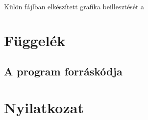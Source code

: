 \documentclass[12pt]{report}
\theoremstyle{definition}
\begin{document}
\newpage
%
Külön fájlban elkészített grafika beillesztését a 


\chapter{Függelék}

\section{A program forráskódja}


\chapter*{Nyilatkozat}

\end{document}
